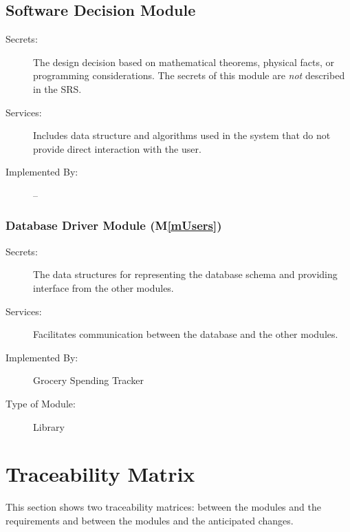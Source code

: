 \documentclass[12pt, titlepage]{article}
\newcommand{\mref}[1]{M\ref{#1}}
\begin{document}
\subsection{Software Decision Module}

\begin{description}
\item[Secrets:] The design decision based on mathematical theorems, physical
  facts, or programming considerations. The secrets of this module are
  \emph{not} described in the SRS.
\item[Services:] Includes data structure and algorithms used in the system that
  do not provide direct interaction with the user. 
\item[Implemented By:] --
\end{description}

\subsubsection{Database Driver Module (\mref{mUsers})}

\begin{description}
\item[Secrets:] The data structures for representing the database schema and providing interface from the other modules.
\item[Services:] Facilitates communication between the database and the other modules.
\item[Implemented By:] Grocery Spending Tracker
\item[Type of Module:] Library
\end{description}

\section{Traceability Matrix} \label{SecTM}

This section shows two traceability matrices: between the modules and the
requirements and between the modules and the anticipated changes.
\end{document}
